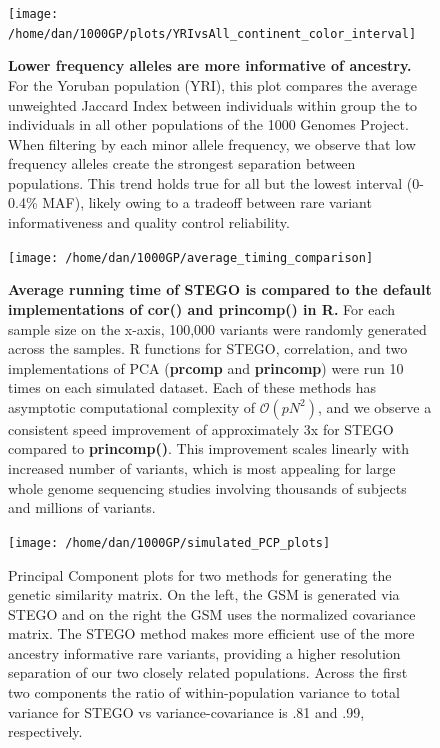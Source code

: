\begin{figure}
\texttt{[image: /home/dan/1000GP/plots/YRIvsAll\_continent\_color\_interval]}\label{YRIvsX}\caption[Allele informativeness by minor frequency]{\textbf{Lower frequency alleles are more informative of ancestry.
}For the Yoruban population (YRI), this plot compares the average
unweighted Jaccard Index between individuals within group the to individuals
in all other populations of the 1000 Genomes Project. When filtering
by each minor allele frequency, we observe that low frequency alleles
create the strongest separation between populations. This trend holds
true for all but the lowest interval (0-0.4\% MAF), likely owing to
a tradeoff between rare variant informativeness and quality control
reliability.}
\label{fig:supp_fig5}
\end{figure}

\begin{figure}
\texttt{[image: /home/dan/1000GP/average\_timing\_comparison]}\caption[Running time comparison of STEGO , \textbf{cor()} and \textbf{princomp()} in R]{\textbf{Average running time of STEGO is compared to the default implementations
of \textbf{cor()} and \textbf{princomp()} in R.} For each sample
size on the x-axis, 100,000 variants were randomly generated across
the samples. R functions for STEGO, correlation, and two implementations
of PCA (\textbf{prcomp }and \textbf{princomp}) were run 10 times on
each simulated dataset. Each of these methods has asymptotic computational
complexity of $\mathcal{O}(pN^{2})$, and we observe a consistent
speed improvement of approximately 3x for STEGO compared to \textbf{princomp()}.
This improvement scales linearly with increased number of variants,
which is most appealing for large whole genome sequencing studies
involving thousands of subjects and millions of variants.}
\label{comp_time}
\end{figure}

\begin{figure}
\texttt{[image: /home/dan/1000GP/simulated\_PCP\_plots]}\caption[Simulated Principal Component plots for two methods for generating the genetic
similarity matrix]{Principal Component plots for two methods for generating the genetic
similarity matrix. On the left, the GSM is generated via STEGO and
on the right the GSM uses the normalized covariance matrix. The STEGO
method makes more efficient use of the more ancestry informative rare
variants, providing a higher resolution separation of our two closely
related populations. Across the first two components the ratio of
within-population variance to total variance for STEGO vs variance-covariance
is .81 and .99, respectively.}
\label{simulatedPCP}
\end{figure}

